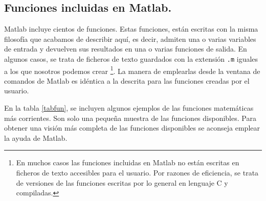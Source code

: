 \subsection{Funciones incluidas en Matlab.} 
Matlab incluye cientos de funciones. Estas funciones, están escritas con la misma filosofía que acabamos de describir aquí, es decir, admiten una o varias variables de entrada y devuelven sus resultados en una o varias funciones de salida. En algunos casos, se trata de ficheros de texto  guardados con la extensión \texttt{.m} iguales a los que nosotros podemos crear \footnote{En muchos casos las funciones incluidas en Matlab no están escritas en ficheros de texto accesibles para el usuario. Por razones de eficiencia, se trata de versiones de las funciones escritas por lo general en lenguaje C y compiladas.}. La manera de emplearlas desde la ventana de comandos de Matlab es idéntica a la descrita para las funciones creadas por el usuario. 

En la tabla \ref{tabfun}, se incluyen algunos ejemplos de las funciones matemáticas más corrientes. Son solo una pequeña muestra de las funciones disponibles. Para obtener una visión más completa de las funciones disponibles se aconseja emplear la ayuda de Matlab.

